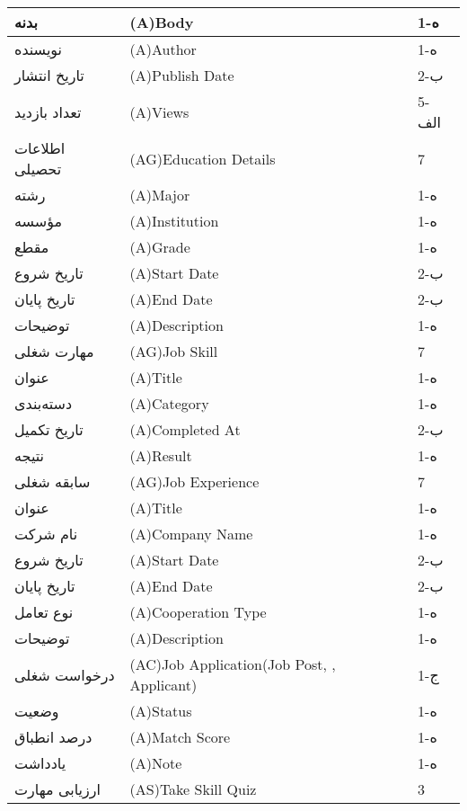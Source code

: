 \documentclass[12pt]{article}
\begin{document}
\begin{longtable}{|l|l|l|}
		بدنه & (A)Body & 1-ه   \\
		\hline
		نویسنده & (A)Author & 1-ه   \\
		\hline
		تاریخ انتشار & (A)Publish Date & 2-ب   \\
		\hline
		تعداد بازدید & (A)Views & 5-الف \\
		\hline
		اطلاعات تحصیلی & (AG)Education Details & 7     \\
		\hline
		رشته & (A)Major & 1-ه   \\
		\hline
		مؤسسه & (A)Institution & 1-ه   \\
		\hline
		مقطع & (A)Grade & 1-ه   \\
		\hline
		تاریخ شروع & (A)Start Date & 2-ب   \\
		\hline
		تاریخ پایان & (A)End Date & 2-ب   \\
		\hline
		توضیحات & (A)Description & 1-ه   \\
		\hline
		مهارت شغلی & (AG)Job Skill & 7     \\
		\hline
		عنوان & (A)Title & 1-ه   \\
		\hline
		دسته‌بندی & (A)Category & 1-ه   \\
		\hline
		تاریخ تکمیل & (A)Completed At & 2-ب   \\
		\hline
		نتیجه & (A)Result & 1-ه   \\
		\hline
		سابقه شغلی & (AG)Job Experience & 7     \\
		\hline
		عنوان & (A)Title & 1-ه   \\
		\hline
		نام شرکت & (A)Company Name & 1-ه   \\
		\hline
		تاریخ شروع & (A)Start Date & 2-ب   \\
		\hline
		تاریخ پایان & (A)End Date & 2-ب   \\
		\hline
		نوع تعامل & (A)Cooperation Type & 1-ه   \\
		\hline
		توضیحات & (A)Description & 1-ه   \\
		\hline
		درخواست شغلی & (AC)Job Application(Job Post, , Applicant) & 1-ج   \\
		\hline
		وضعیت & (A)ُStatus & 1-ه   \\
		\hline
		درصد انطباق & (A)Match Score & 1-ه   \\
		\hline
		یادداشت & (A)ُNote & 1-ه   \\
		\hline
		ارزیابی مهارت & (AS)Take Skill Quiz & 3     \\
		\hline

\end{longtable}
\end{document}

